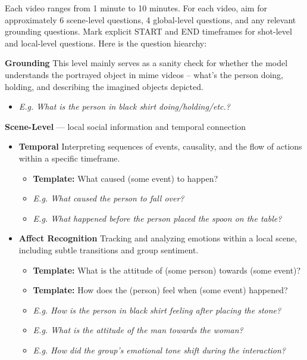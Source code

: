 \begin{tcolorbox}[colframe=black, colback=white, arc=3mm, boxrule=1pt, width=\linewidth, title=\textbf{Annotation Instructions}, breakable]
Each video ranges from 1 minute to 10 minutes. For each video, aim for approximately 6 scene-level questions, 4 global-level questions, and any relevant grounding questions. Mark explicit START and END timeframes for shot-level and local-level questions. Here is the question hiearchy:

\textbf{Grounding} This level mainly serves as a sanity check for whether the model understands the portrayed object in mime videos – what’s the person doing, holding, and describing the imagined objects depicted.
    \begin{itemize}
        \item \textit{E.g. What is the person in black shirt doing/holding/etc.?}
    \end{itemize}


\textbf{Scene-Level} — local social information and temporal connection
\begin{itemize}
    \item \textbf{Temporal} Interpreting sequences of events, causality, and the flow of actions within a specific timeframe.
    \begin{itemize}
        \item \textbf{Template:} What caused (some event) to happen? 
        \item \textit{E.g. What caused the person to fall over?}
        \item \textit{E.g. What happened before the person placed the spoon on the table?}
    \end{itemize}

    \item \textbf{Affect Recognition} Tracking and analyzing emotions within a local scene, including subtle transitions and group sentiment. 
    \begin{itemize}
        \item \textbf{Template:} What is the attitude of (some person) towards (some event)? 
        \item \textbf{Template:} How does the (person) feel when (some event) happened?
        \item \textit{E.g. How is the person in black shirt feeling after placing the stone?} 
        \item \textit{E.g. What is the attitude of the man towards the woman?}
        \item \textit{E.g. How did the group's emotional tone shift during the interaction?}
    \end{itemize}


\end{itemize}
\end{tcolorbox}
